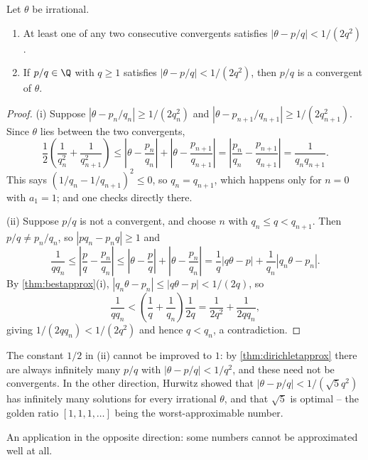 \begin{theorem}\label{thm:converse}
	Let $\theta$ be irrational.
	\begin{enumerate}[label=(\roman*)]
		\item At least one of any two consecutive convergents satisfies $|\theta - p/q| < 1/(2q^2)$.
		\item If $p/q \in \Q$ with $q \geq 1$ satisfies $|\theta - p/q| < 1/(2q^2)$, then $p/q$ is a convergent of $\theta$.
	\end{enumerate}
\end{theorem}
\begin{proof}
	(i) Suppose $|\theta - p_n/q_n| \geq 1/(2q_n^2)$ and $|\theta - p_{n+1}/q_{n+1}| \geq 1/(2q_{n+1}^2)$. Since $\theta$ lies between the two convergents,
	$$
	\frac12\left(\frac1{q_n^2} + \frac1{q_{n+1}^2}\right) \leq \left|\theta - \frac{p_n}{q_n}\right| + \left|\theta - \frac{p_{n+1}}{q_{n+1}}\right| = \left|\frac{p_n}{q_n} - \frac{p_{n+1}}{q_{n+1}}\right| = \frac1{q_nq_{n+1}}.
	$$
	This says $(1/q_n - 1/q_{n+1})^2 \leq 0$, so $q_n = q_{n+1}$, which happens only for $n = 0$ with $a_1 = 1$; and one checks directly there.

	(ii) Suppose $p/q$ is not a convergent, and choose $n$ with $q_n \leq q < q_{n+1}$. Then $p/q \neq p_n/q_n$, so $|pq_n - p_nq| \geq 1$ and
	$$
	\frac1{qq_n} \leq \left|\frac pq - \frac{p_n}{q_n}\right| \leq \left|\theta - \frac pq\right| + \left|\theta - \frac{p_n}{q_n}\right| = \frac1q|q\theta - p| + \frac1{q_n}|q_n\theta - p_n|.
	$$
	By \autoref{thm:bestapprox}(i), $|q_n\theta - p_n| \leq |q\theta - p| < 1/(2q)$, so
	$$
	\frac1{qq_n} < \left(\frac1q + \frac1{q_n}\right)\frac{1}{2q} = \frac1{2q^2} + \frac1{2qq_n},
	$$
	giving $1/(2qq_n) < 1/(2q^2)$ and hence $q < q_n$, a contradiction.
\end{proof}

\begin{remark}
	The constant $1/2$ in (ii) cannot be improved to $1$: by \autoref{thm:dirichletapprox} there are always infinitely many $p/q$ with $|\theta - p/q| < 1/q^2$, and these need not be convergents. In the other direction, Hurwitz showed that $|\theta - p/q| < 1/(\sqrt5 q^2)$ has infinitely many solutions for every irrational $\theta$, and that $\sqrt5$ is optimal -- the golden ratio $[1,1,1,\dots]$ being the worst-approximable number.
\end{remark}

An application in the opposite direction: some numbers cannot be approximated well at all.

